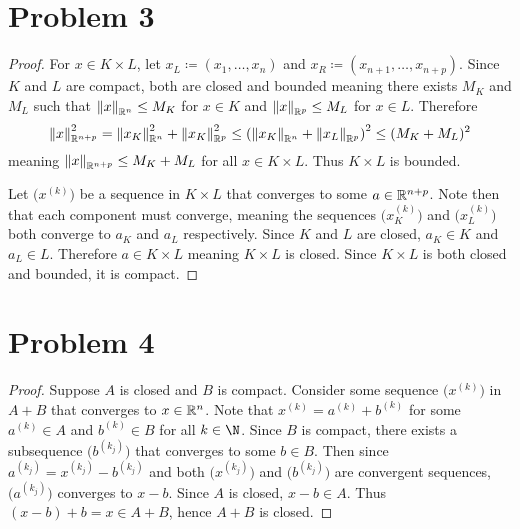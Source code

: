 \documentclass{eeleyes}
\begin{document}
\section*{Problem 3}
\begin{proof}
    For $x \in K \times L$, let $x_L \coloneq (x_1, \ldots, x_n)$ and $x_R \coloneq (x_{n+1}, \ldots, x_{n+p})$. Since $K$ and $L$ are compact, both are closed and bounded meaning there exists $M_K$ and $M_L$ such that $\norm{x}_{\mathbb{R}^n} \leq M_K$ for $x \in K$ and $\norm{x}_{\mathbb{R}^p} \leq M_L$ for $x \in L$. Therefore
    \[
        \norm{x}_{\mathbb{R}^{n + p}}^2 = \norm{x_K}_{\mathbb{R}^n}^2 + \norm{x_K}_{\mathbb{R}^p}^2 \leq \qty(\norm{x_K}_{\mathbb{R}^n} + \norm{x_L}_{\mathbb{R}^p})^2 \leq (M_K + M_L)^2
    \]
    meaning $\norm{x}_{\mathbb{R}^{n+p}} \leq M_K + M_L$ for all $x \in K \times L$. Thus $K \times L$ is bounded.

    Let $\bigl(x^{(k)}\bigr)$ be a sequence in $K \times L$ that converges to some $a \in \mathbb{R}^{n+p}$. Note then that each component must converge, meaning the sequences $\bigl(x_K^{(k)}\bigr)$ and $\bigl(x_L^{(k)}\bigr)$ both converge to $a_K$ and $a_L$ respectively. Since $K$ and $L$ are closed, $a_K \in K$ and $a_L \in L$. Therefore $a \in K \times L$ meaning $K \times L$ is closed. Since $K \times L$ is both closed and bounded, it is compact.
\end{proof}

\section*{Problem 4}
\begin{proof}
    Suppose $A$ is closed and $B$ is compact. Consider some sequence $\bigl(x^{(k)}\bigr)$ in $A + B$ that converges to $x \in \mathbb{R}^n$. Note that $x^{(k)} = a^{(k)} + b^{(k)}$ for some $a^{(k)} \in A$ and $b^{(k)} \in B$ for all $k \in \N$. Since $B$ is compact, there exists a subsequence $\bigl(b^{(k_j)}\bigr)$ that converges to some $b \in B$. Then since $a^{(k_j)} = x^{(k_j)} - b^{(k_j)}$ and both $\bigl(x^{(k_j)}\bigr)$ and $\bigl(b^{(k_j)}\bigr)$ are convergent sequences, $\bigl(a^{(k_j)}\bigr)$ converges to $x - b$. Since $A$ is closed, $x - b \in A$. Thus $(x-b) + b = x \in A + B$, hence $A + B$ is closed.
\end{proof}
\end{document}
